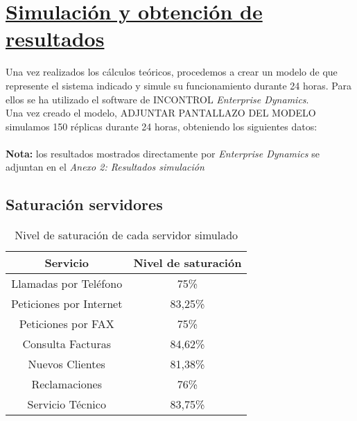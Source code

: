 \section{\textbf{\underline{Simulación y obtención de resultados}}}
Una vez realizados los cálculos teóricos, procedemos a crear un modelo de que represente el sistema indicado y simule su funcionamiento durante 24 horas. Para ellos se ha utilizado el software de INCONTROL \textit{Enterprise Dynamics}.\\ 
Una vez creado el modelo, ADJUNTAR PANTALLAZO DEL MODELO simulamos 150 réplicas durante 24 horas, obteniendo los siguientes datos:\\\\
\textbf{Nota: }los resultados mostrados directamente por \textit{Enterprise Dynamics} se adjuntan en el \textit{Anexo 2: Resultados simulación}
\subsection{Saturación servidores}
\begin{table}[H]
  \begin{center}
  \begin{tabular}{|c|c|}
    \hline
    \textbf{Servicio}       & \textbf{Nivel de saturación} \\ \hline
    Llamadas por Teléfono   & 75\%                   \\ \hline
    Peticiones por Internet & 83,25\%                  \\ \hline
    Peticiones por FAX      & 75\%                   \\ \hline
    Consulta Facturas      & 84,62\%                   \\ \hline
    Nuevos Clientes      & 81,38\%                   \\ \hline
    Reclamaciones      & 76\%                   \\ \hline
    Servicio Técnico      & 83,75\%                  \\ \hline
  \end{tabular}
\end{center}
  \caption{Nivel de saturación de cada servidor simulado}
  \end{table}
